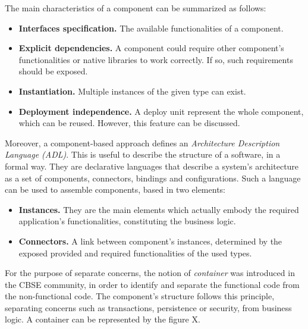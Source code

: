 The main characteristics of a component can be summarized as follows:
\begin{itemize}
	\item \textbf{Interfaces specification.} The available functionalities of a component.
	\item \textbf{Explicit dependencies.} A component could require other component's functionalities or native libraries to work correctly.
	If so, such requirements should be exposed.
	\item \textbf{Instantiation.} Multiple instances of the given type can exist.
	\item \textbf{Deployment independence.} A deploy unit represent the whole component, which can be reused. However, this feature can be discussed.
\end{itemize}
Moreover, a component-based approach defines an \textit{Architecture Description Language (ADL)}.
This is useful to describe the structure of a software, in a formal way\cite{taylor2009architectural}\cite{len2003software}\cite{medvidovic2000classification}.
They are declarative languages that describe a system's architecture as a set of components, connectors, bindings and configurations.
Such a language can be used to assemble components, based in two elements:

\begin{itemize}
	\item \textbf{Instances.} They are the main elements which actually embody the required application's functionalities, constituting the business logic.
	\item \textbf{Connectors.} A link between component's instances, determined by the exposed provided and required functionalities of the used types.
\end{itemize}

For the purpose of separate concerns, the notion of \textit{container} was introduced in the CBSE community, in order to identify and separate the functional code from the non-functional code.
The component's structure follows this principle, separating concerns such as transactions, persistence or security, from business logic.
A container can be represented by the figure X. 

